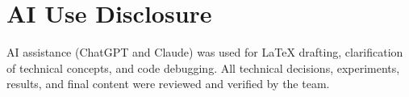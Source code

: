 \documentclass[11pt,a4paper]{article}
\begin{document}
\section{AI Use Disclosure}

AI assistance (ChatGPT and Claude) was used for LaTeX drafting,
clarification of technical concepts, and code debugging. All technical
decisions, experiments, results, and final content were reviewed and
verified by the team.



\end{document}
